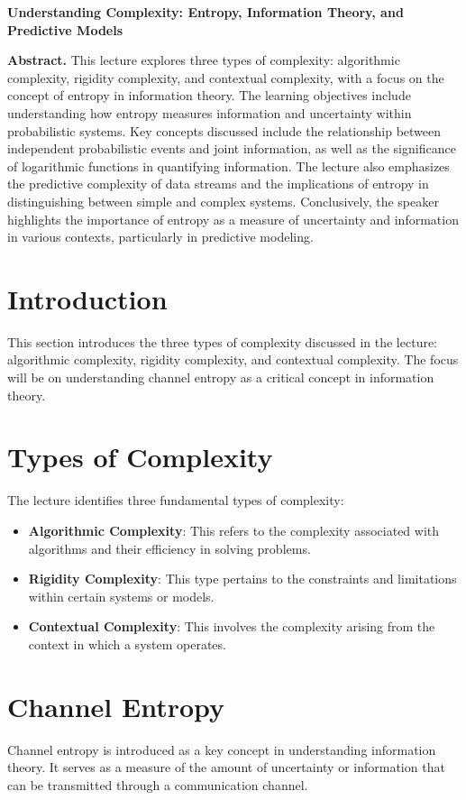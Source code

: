 \documentclass[a4paper]{article}
\begin{document}
\begin{center}
{\LARGE \textbf{Understanding Complexity: Entropy, Information Theory, and Predictive Models}}\\[1em]
\end{center}

\textbf{Abstract.} This lecture explores three types of complexity: algorithmic complexity, rigidity complexity, and contextual complexity, with a focus on the concept of entropy in information theory. The learning objectives include understanding how entropy measures information and uncertainty within probabilistic systems. Key concepts discussed include the relationship between independent probabilistic events and joint information, as well as the significance of logarithmic functions in quantifying information. The lecture also emphasizes the predictive complexity of data streams and the implications of entropy in distinguishing between simple and complex systems. Conclusively, the speaker highlights the importance of entropy as a measure of uncertainty and information in various contexts, particularly in predictive modeling.

\section{Introduction}
This section introduces the three types of complexity discussed in the lecture: algorithmic complexity, rigidity complexity, and contextual complexity. The focus will be on understanding channel entropy as a critical concept in information theory.

\section{Types of Complexity}
The lecture identifies three fundamental types of complexity:
\begin{itemize}
    \item \textbf{Algorithmic Complexity}: This refers to the complexity associated with algorithms and their efficiency in solving problems.
    \item \textbf{Rigidity Complexity}: This type pertains to the constraints and limitations within certain systems or models.
    \item \textbf{Contextual Complexity}: This involves the complexity arising from the context in which a system operates.
\end{itemize}

\section{Channel Entropy}
Channel entropy is introduced as a key concept in understanding information theory. It serves as a measure of the amount of uncertainty or information that can be transmitted through a communication channel. 
\end{document}
